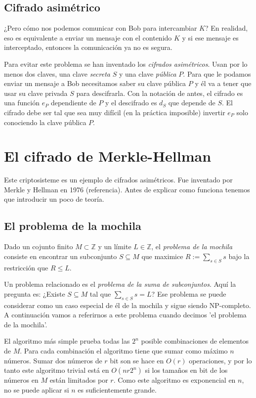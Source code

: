 \documentclass[12pt]{article}
\newcommand{\Z}{\mathbb{Z}}
\begin{document}
\subsection*{Cifrado asimétrico}

¿Pero cómo nos podemos comunicar con Bob para intercambiar $K$? En realidad, eso es equivalente a enviar un mensaje con el contenido $K$ y si ese mensaje es interceptado, entonces la comunicación ya no es segura.

Para evitar este problema se han inventado los \emph{cifrados asimétricos}. Usan por lo menos dos claves, una clave \emph{secreta} $S$ y una clave \emph{pública} $P$. Para que le podamos enviar un mensaje a Bob necesitamos saber su clave pública $P$ y él va a tener que usar su clave privada $S$ para descifrarla. Con la notación de antes, el cifrado es una función $e_P$ dependiente de $P$ y el descifrado es $d_S$ que depende de $S$. El cifrado debe ser tal que sea muy difícil (en la práctica imposible) invertir $e_P$ solo conociendo la clave pública $P$.

\section{El cifrado de Merkle-Hellman}

Este criptosisteme es un ejemplo de cifrados asimétricos. Fue inventado por Merkle y Hellman en 1976 (referencia). Antes de explicar como funciona tenemos que introducir un poco de teoría.

\subsection*{El problema de la mochila}

Dado un cojunto finito $M \subset \Z$ y un límite $L \in \Z$, el \emph{problema de la mochila} consiste en encontrar un subconjunto $S \subseteq M$ que maximice $R := \sum_{s \in S}s$ bajo la restricción que $R \leq L$.

Un problema relacionado es el \emph{problema de la suma de subconjuntos}. Aquí la pregunta es: ¿Existe $S \subseteq M$ tal que $\sum_{s \in S}s = L$? Ese problema se puede considerar como un caso especial de él de la mochila y sigue siendo NP-completo. A continuación vamos a referirnos a este problema cuando decimos 'el problema de la mochila'.

El algoritmo más simple prueba todas las $2^n$ posible combinaciones de elementos de $M$. Para cada combinación el algoritmo tiene que sumar como máximo $n$ números. Sumar dos números de $r$ bit son se hace en $O(r)$ operaciones, y por lo tanto este algoritmo trivial está en $O(nr2^n)$ si los tamaños en bit de los números en $M$ están limitados por $r$. Como este algoritmo es exponencial en $n$, no se puede aplicar si $n$ es suficientemente grande.
\end{document}
